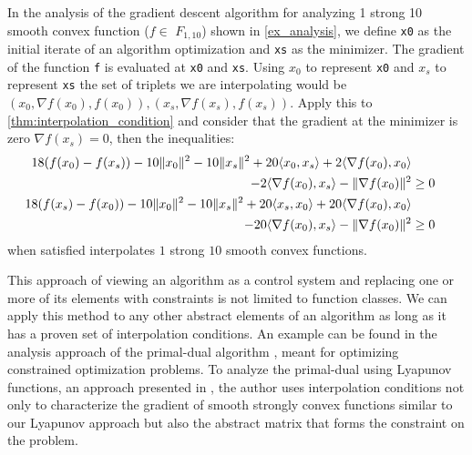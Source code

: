 In the analysis of the gradient descent algorithm for analyzing 1 strong 10 smooth convex function (\(f \in \) \(F_{1,10}\)) shown in \cref{ex_analysis}, we define \texttt{x0} as the initial iterate of an algorithm optimization and \texttt{xs} as the minimizer. The gradient of the function \texttt{f} is evaluated at \texttt{x0} and \texttt{xs}. Using \(x_0\) to represent \texttt{x0} and \(x_s\) to represent \texttt{xs} the set of triplets we are interpolating would be \({(x_0, \nabla f(x_0), f(x_0)), (x_s, \nabla f(x_s), f(x_s))}\). Apply this to \cref{thm:interpolation_condition} and consider that the gradient at the minimizer is zero $\nabla f(x_s) = 0$, then the inequalities:
\begin{equation} \label{eqn:int_cond}
	\begin{split}
		18(f(x_0)-f(x_s))-10\|x_0\|^2 -10\|x_s\|^2 + 20\langle x_0, x_s \rangle + 2\langle \nabla f(x_0), x_0 \rangle \\
		- 2\langle \nabla f(x_0), x_s \rangle - \|\nabla f(x_0)\|^2 &\geq 0      \\
		18(f(x_s)-f(x_0))-10\|x_0\|^2 -10\|x_s\|^2 + 20\langle x_s, x_0 \rangle + 20\langle \nabla f(x_0), x_0 \rangle \\
		- 20\langle \nabla f(x_0), x_s \rangle - \|\nabla f(x_0)\|^2 &\geq 0
	\end{split}
\end{equation}
when satisfied interpolates $1$ strong $10$ smooth convex functions.

This approach of viewing an algorithm as a control system and replacing one or more of its elements with constraints is not limited to function classes. We can apply this method to any other abstract elements of an algorithm as long as it has a proven set of interpolation conditions. An example can be found in the analysis approach of the primal-dual algorithm \cite{primaldualalgo}, meant for optimizing constrained optimization problems. To analyze the primal-dual using Lyapunov functions, an approach presented in \cite{primaldual}, the author uses interpolation conditions not only to characterize the gradient of smooth strongly convex functions similar to our Lyapunov approach but also the abstract matrix that forms the constraint on the problem.

